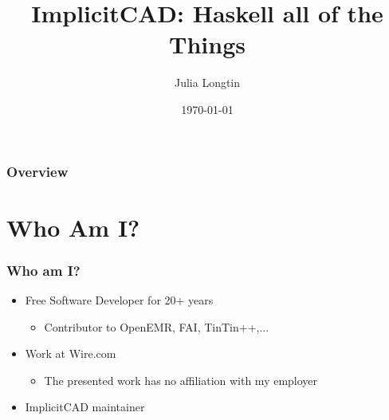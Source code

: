 \documentclass{beamer}
\title[BobKonf]{ImplicitCAD: Haskell all of the Things} %
\author{Julia Longtin} %
\institute[ImplicitCAD] %
{
ImplicitCAD Project \\ %
\medskip
\textit{julia.longtin@gmail.com} %
}
\date{\today} %
\begin{document}
\begin{frame}
\titlepage %
\end{frame}

\begin{frame}
\frametitle{Overview} %
\tableofcontents %
\end{frame}


\section{Who Am I?} %

\begin{frame}
\frametitle{Who am I?}
\begin{itemize}
\item Free Software Developer for 20+ years
  \begin{itemize}
  \item Contributor to OpenEMR, FAI, TinTin++,...
  \end{itemize}
\item Work at Wire.com
  \begin{itemize}
  \item The presented work has no affiliation with my employer
  \end{itemize}
\item ImplicitCAD maintainer
\end{itemize}
\end{frame}
\end{document}
